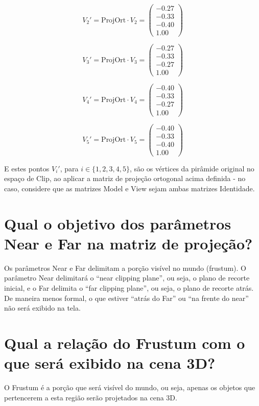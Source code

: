 \documentclass{article}
\begin{document}
$$V_2' = \text{ProjOrt} \cdot V_2 = \begin{pmatrix}
-0.27 \\
-0.33 \\
-0.40 \\
1.00 
\end{pmatrix}$$

$$V_3' = \text{ProjOrt} \cdot V_3 = \begin{pmatrix}
-0.27 \\
-0.33 \\
-0.27 \\
1.00 
\end{pmatrix}$$

$$V_4' = \text{ProjOrt} \cdot V_4 = \begin{pmatrix}
-0.40 \\
-0.33 \\
-0.27 \\
1.00 
\end{pmatrix}$$

$$V_5' = \text{ProjOrt} \cdot V_5 = \begin{pmatrix}
-0.40 \\
-0.33 \\
-0.40 \\
1.00 
\end{pmatrix}$$

E estes pontos $V_i'$, para $i \in \{1, 2, 3, 4, 5\}$, são os vértices da pirâmide original no espaço de Clip, ao aplicar a matriz de projeção ortogonal acima definida - no caso, considere que as matrizes Model e View sejam ambas matrizes Identidade.

\section{Qual o objetivo dos parâmetros Near e Far na matriz de projeção?}

Os parâmetros Near e Far delimitam a porção visível no mundo (frustum). O parâmetro Near delimitará o ``near clipping plane'', ou seja, o plano de recorte inicial, e o Far delimita o ``far clipping plane'', ou seja, o plano de recorte atrás. De maneira menos formal, o que estiver ``atrás do Far'' ou ``na frente do near'' não será exibido na tela.

\section{Qual a relação do Frustum com o que será exibido na cena 3D?}

O Frustum é a porção que será visível do mundo, ou seja, apenas os objetos que pertencerem a esta região serão projetados na cena 3D.
\end{document}
